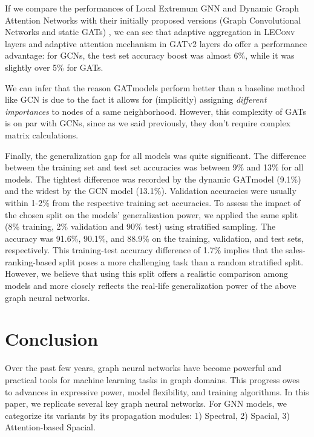 \documentclass[sigconf, nonacm]{acmart}
\begin{document}
If we compare the performances of Local Extremum GNN \cite{LeConvPaper} and Dynamic Graph Attention Networks \cite{Brodyetal} with their initially proposed versions (Graph Convolutional Networks and static GATs) \cite{Kipf&Welling2017} \cite{Velickovic2017}, we can see that adaptive aggregation in \textsc{LEConv} layers and adaptive attention mechanism in \textsc{GATv2}\cite{Brodyetal} layers do offer a performance advantage: for \textsc{GCN}s, the test set accuracy boost was almost 6\%, while it was slightly over 5\% for GATs.

We can infer that the reason \textsc{GAT}models \cite{Velickovic2017} perform better than a baseline method like \textsc{GCN} \cite{Kipf&Welling2017} is due to the fact it  allows for (implicitly) assigning \textit{different importances} to nodes of a same neighborhood. However, this complexity of GATs is on par with \textsc{GCN}s, since as we said previously, they don't require complex matrix calculations. 

Finally, the generalization gap for all models was quite significant. The difference between the training set and test set accuracies was between 9\% and 13\% for all models. The tightest difference was recorded by the dynamic \textsc{GAT}model \cite{Brodyetal} (9.1\%) and the widest by the \textsc{GCN} model \cite{Kipf&Welling2017} (13.1\%). Validation accuracies were usually within 1-2\% from the respective training set accuracies. To assess the impact of the chosen split on the models' generalization power, we applied the same split (8\% training, 2\% validation and 90\% test) using stratified sampling. The accuracy was 91.6\%, 90.1\%, and 88.9\% on the training, validation, and test sets, respectively. This training-test accuracy difference of 1.7\% implies that the sales-ranking-based split poses a more challenging task than a random stratified split. However, we believe that using this split offers a realistic comparison among models and more closely reflects the real-life generalization power of the above graph neural networks.

\section*{Conclusion}
Over the past few years, graph neural networks have become powerful and practical tools for machine learning tasks in graph domains. This progress owes to advances in expressive power, model flexibility, and training algorithms. In this paper, we replicate several key graph neural networks. For GNN models, we categorize its variants by its propagation modules: 1) Spectral, 2) Spacial, 3) Attention-based Spacial.
\end{document}
